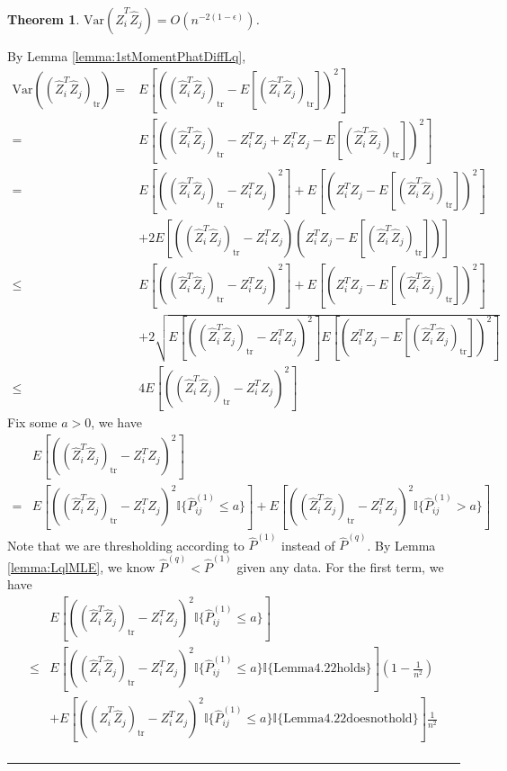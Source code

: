 \documentclass[a4paper]{article}
\newenvironment{proof}{{\bf Proof:  }}{\hfill\rule{2mm}{2mm}}
\newtheorem{theorem}[fact]{Theorem}
\begin{document}
\begin{theorem}
\label{thm:VarASELq}
$\mathrm{Var}(\hat{Z}_i^T \hat{Z}_j) = O(n^{-2(1-\epsilon)})$.
\end{theorem}
\begin{proof}
By Lemma \ref{lemma:1stMomentPhatDiffLq},
\begin{align*}
	\mathrm{Var}((\hat{Z}_i^T \hat{Z}_j)_{\mathrm{tr}})
    = & E[((\hat{Z}_i^T \hat{Z}_j)_{\mathrm{tr}} - E[(\hat{Z}_i^T \hat{Z}_j)_{\mathrm{tr}}])^2] \\
    = & E[((\hat{Z}_i^T \hat{Z}_j)_{\mathrm{tr}} - Z_i^T Z_j + Z_i^T Z_j - E[(\hat{Z}_i^T \hat{Z}_j)_{\mathrm{tr}}])^2] \\
    = & E[((\hat{Z}_i^T \hat{Z}_j)_{\mathrm{tr}} - Z_i^T Z_j)^2] + E[(Z_i^T Z_j - E[(\hat{Z}_i^T \hat{Z}_j)_{\mathrm{tr}}])^2] \\ 
    & + 2E[((\hat{Z}_i^T \hat{Z}_j)_{\mathrm{tr}} - Z_i^T Z_j)(Z_i^T Z_j - E[(\hat{Z}_i^T \hat{Z}_j)_{\mathrm{tr}}])] \\
    \le & E[((\hat{Z}_i^T \hat{Z}_j)_{\mathrm{tr}} - Z_i^T Z_j)^2] + E[(Z_i^T Z_j - E[(\hat{Z}_i^T \hat{Z}_j)_{\mathrm{tr}}])^2] \\ 
    & + 2\sqrt{E[((\hat{Z}_i^T \hat{Z}_j)_{\mathrm{tr}} - Z_i^T Z_j)^2] E[(Z_i^T Z_j - E[(\hat{Z}_i^T \hat{Z}_j)_{\mathrm{tr}}])^2]} \\
    \le & 4 E[((\hat{Z}_i^T \hat{Z}_j)_{\mathrm{tr}} - Z_i^T Z_j)^2]
\end{align*}
Fix some $a > 0$, we have
\begin{align*}
	& E[((\hat{Z}_i^T \hat{Z}_j)_{\mathrm{tr}} - Z_i^T Z_j)^2] \\
	= & E[((\hat{Z}_i^T \hat{Z}_j)_{\mathrm{tr}} - Z_i^T Z_j)^2 \mathbb{I}\{\hat{P}^{(1)}_{ij} \le a\}]
	+ E[((\hat{Z}_i^T \hat{Z}_j)_{\mathrm{tr}} - Z_i^T Z_j)^2 \mathbb{I}\{\hat{P}^{(1)}_{ij} > a\}]
\end{align*}
Note that we are thresholding according to $\hat{P}^{(1)}$ instead of $\hat{P}^{(q)}$. By Lemma \ref{lemma:LqlMLE}, we know $\hat{P}^{(q)} < \hat{P}^{(1)}$ given any data.
For the first term, we have
\begin{align*}
	& E[((\hat{Z}_i^T \hat{Z}_j)_{\mathrm{tr}} - Z_i^T Z_j)^2 \mathbb{I}\{\hat{P}^{(1)}_{ij} \le a\}] \\
	\le & E[((\hat{Z}_i^T \hat{Z}_j)_{\mathrm{tr}} - Z_i^T Z_j)^2 \mathbb{I}\{\hat{P}^{(1)}_{ij} \le a\} \mathbb{I}\{\mathrm{Lemma 4.22 holds}\}] (1 - \frac{1}{n^2}) \\
	& + E[((\hat{Z}_i^T \hat{Z}_j)_{\mathrm{tr}} - Z_i^T Z_j)^2 \mathbb{I}\{\hat{P}^{(1)}_{ij} \le a\} \mathbb{I}\{\mathrm{Lemma 4.22 does not hold}\}] \frac{1}{n^2} \\

\end{align*}
\end{proof}
\end{document}
